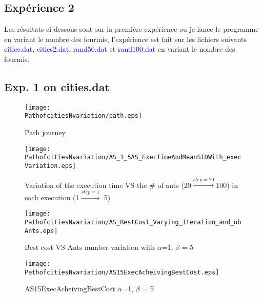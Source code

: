 
\subsection{Expérience 2}
Les résultats ci-dessous sont sur la première expérience ou je lance le programme en variant le nombre des fourmis, l'expérience est fait sur les fichiers suivants 
\textcolor{blue}{cities.dat},  \textcolor{blue}{cities2.dat},  \textcolor{blue}{rand50.dat} et  \textcolor{blue}{rand100.dat} en variant le nombre des fourmis.

\subsection*{ \centering Exp. 1 on cities.dat }
\begin{figure}[H]
	\begin{minipage}[t]{0.5\linewidth}
		\texttt{[image: \\PathofcitiesNvariation/path.eps]}
		\caption{Path journey}
		\label{fig:PathofcitiesNvariation:path}
	\end{minipage}
	\hspace{2mm}
	\begin{minipage}[t]{0.5\linewidth}
	\texttt{[image: \\PathofcitiesNvariation/AS\_1\_5AS\_ExecTimeAndMeanSTDWith\_execVariation.eps]}
	\caption{Variation of the execution time VS the \# of ants (20$\stackrel{step=20}{\rightarrow}$100) in each execution (1$\stackrel{step=1}{\rightarrow}$ 5)}
	\label{fig:PathofcitiesNvariation:AS_1_5AS_ExecTimeAndMeanSTDWith_execVariation}
	\end{minipage}
\end{figure}
\begin{figure}[H]
		\begin{minipage}[t]{.5\linewidth}
		\centering
		\texttt{[image: \\PathofcitiesNvariation/AS\_BestCost\_Varying\_Iteration\_and\_nbAnts.eps]}
		\caption{Best cost VS Ants number variation with $\alpha$=1, $ \beta $ = 5}
		\label{fig:PathofcitiesNvariation:AS_BestCost_Varying_Iteration_and_nbAnts}
		\end{minipage}
		\begin{minipage}[t]{.5\linewidth}
		\texttt{[image: \\PathofcitiesNvariation/AS15ExecAcheivingBestCost.eps]}
		\caption{AS15ExecAcheivingBestCost $\alpha$=1, $ \beta $ = 5}
		\label{fig:PathofcitiesNvariation:AS15ExecAcheivingBestCost}
		\end{minipage}
\end{figure}
